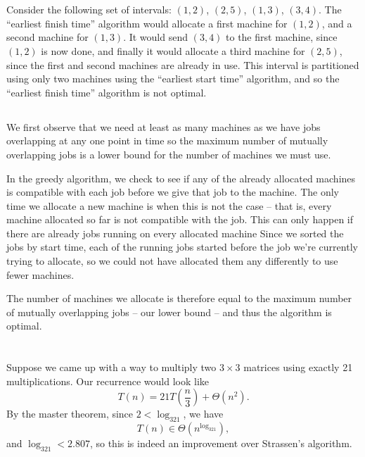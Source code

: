 \documentclass[11pt]{article}
\begin{document}
\section{} %
\subsection{} %
Consider the following set of intervals:
$(1,2)$, $(2,5)$, $(1,3)$, $(3,4)$.
\newline
\newline
The ``earliest finish time'' algorithm would allocate a first machine for $(1,2)$, and a second machine for $(1,3)$.
It would send $(3,4)$ to the first machine, since $(1,2)$ is now done, and finally it would allocate a third machine for $(2,5)$, since the first and second machines are already in use.
This interval is partitioned using only two machines using the ``earliest start time'' algorithm, and so the ``earliest finish time'' algorithm is not optimal.


\subsection{} %
We first observe that we need at least as many machines as we have jobs overlapping at any one point in time so the maximum number of mutually overlapping jobs is a lower bound for the number of machines we must use.

In the greedy algorithm, we check to see if any of the already allocated machines is compatible with each job before we give that job to the machine.
The only time we allocate a new machine is when this is not the case -- that is, every machine allocated so far is not compatible with the job.
This can only happen if there are already jobs running on every allocated machine
Since we sorted the jobs by start time, each of the running jobs started before the job we're currently trying to allocate, so we could not have allocated them any differently to use fewer machines.

The number of machines we allocate is therefore equal to the maximum number of mutually overlapping jobs -- our lower bound -- and thus the algorithm is optimal.


\section{} %
Suppose we came up with a way to multiply two $3\times3$ matrices using exactly 21 multiplications.
Our recurrence would look like
\[T(n) = 21T\left(\frac{n}{3}\right)+\Theta\left(n^2\right).\]
By the master theorem, since $2 < \log_321$, we have
\[T(n) \in \Theta\left(n^{\log_321}\right),\]
and $\log_321 < 2.807$, so this is indeed an improvement over Strassen's algorithm.
\end{document}
